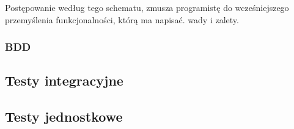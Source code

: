     Postępowanie według tego schematu, zmusza programistę do wcześniejszego przemyślenia funkcjonalności, którą ma napisać.
    wady i zalety.


    \subsubsection{BDD}

	\newpage
  \subsection{Testy integracyjne}
  \subsection{Testy jednostkowe}
